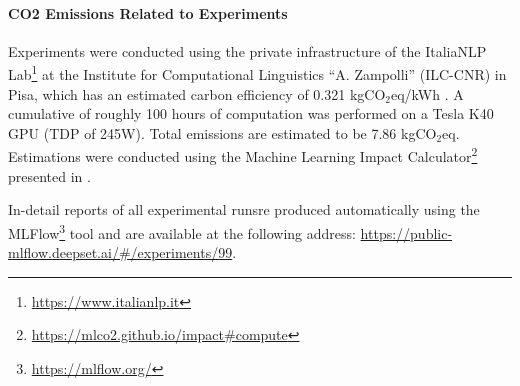 \documentclass[a4paper, nobind]{templates/ociamthesis}
\newcommand*{\bibtitle}{\textbf{References}}
\begin{document}
\paragraph{CO2 Emissions Related to Experiments} Experiments were conducted using the private infrastructure of the ItaliaNLP Lab\footnote{\url{https://www.italianlp.it}} at the Institute for Computational Linguistics ``A. Zampolli'' (ILC-CNR) in Pisa, which has an estimated carbon efficiency of 0.321 kgCO\(_2\)eq/kWh \autocite{moro2018electricity}. A cumulative of roughly 100 hours of computation was performed on a Tesla K40 GPU (TDP of 245W). Total emissions are estimated to be 7.86 kgCO\(_2\)eq. Estimations were conducted using the Machine Learning Impact Calculator\footnote{\url{https://mlco2.github.io/impact\#compute}} presented in \textcite{lacoste2019quantifying}.

In-detail reports of all experimental runsre produced automatically using the MLFlow\footnote{\url{https://mlflow.org/}} tool and are available at the following address: \url{https://public-mlflow.deepset.ai/\#/experiments/99}.




\setlength{\baselineskip}{0pt} %

{\renewcommand*\MakeUppercase[1]{#1}%
\printbibliography[heading=bibintoc,title={\bibtitle}]}
\end{document}
